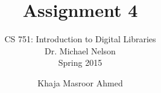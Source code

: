 \documentclass[envcountsame,envcountchap]{svmono}
\begin{document}
\author{Khaja Masroor Ahmed}
\title{Assignment 4}

\subtitle{CS 751:  Introduction to Digital Libraries\\Dr. Michael Nelson\\Spring 2015}

\maketitle

\frontmatter

\tableofcontents

\mainmatter





\backmatter



\nocite{*}
\end{document}
